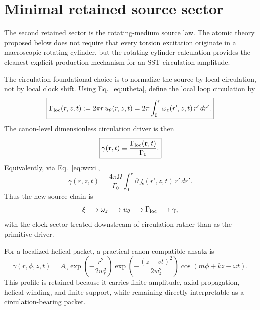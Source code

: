 \documentclass[11pt,a4paper]{article}
\begin{document}
    \section{Minimal retained source sector}
    \label{sec:source-sector}
    The second retained sector is the rotating-medium source law. The atomic theory proposed below does not require that every torsion excitation originate in a macroscopic rotating cylinder, but the rotating-cylinder calculation provides the cleanest explicit production mechanism for an SST circulation amplitude.
    
    The circulation-foundational choice is to normalize the source by local circulation, not by local clock shift. Using Eq.~\eqref{eq:utheta}, define the local loop circulation by
    \begin{equation}
        \label{eq:GammaLoc}
        \boxed{
            \Gamma_{\rm loc}(r,z,t)
            :=
            2\pi r\,u_\theta(r,z,t)
            =
            2\pi\int_0^r \omega_z(r',z,t)\,r'\,dr'.
        }
    \end{equation}
    The canon-level dimensionless circulation driver is then
    \begin{equation}
        \label{eq:gammaDef}
        \boxed{
            \gamma(\mathbf r,t)
            \equiv
            \frac{\Gamma_{\rm loc}(\mathbf r,t)}{\Gamma_0}.
        }
    \end{equation}
    Equivalently, via Eq.~\eqref{eq:wzxi},
    \begin{equation}
        \label{eq:gammaXi}
        \gamma(r,z,t)
        =
        \frac{4\pi\Omega}{\Gamma_0}
        \int_0^r \partial_z \xi(r',z,t)\,r'\,dr'.
    \end{equation}
    Thus the new source chain is
    \begin{equation}
        \label{eq:source-chain}
        \xi \longrightarrow \omega_z \longrightarrow u_\theta \longrightarrow \Gamma_{\rm loc} \longrightarrow \gamma,
    \end{equation}
    with the clock sector treated downstream of circulation rather than as the primitive driver.
    
    For a localized helical packet, a practical canon-compatible ansatz is
    \begin{equation}
        \label{eq:gammaPacket}
        \gamma(r,\phi,z,t)
        =
        A_\gamma
        \exp\!\left(-\frac{r^2}{2w_r^2}\right)
        \exp\!\left(-\frac{(z-vt)^2}{2w_z^2}\right)
        \cos\!\left(m\phi+kz-\omega t\right).
    \end{equation}
    This profile is retained because it carries finite amplitude, axial propagation, helical winding, and finite support, while remaining directly interpretable as a circulation-bearing packet.
    
\end{document}
